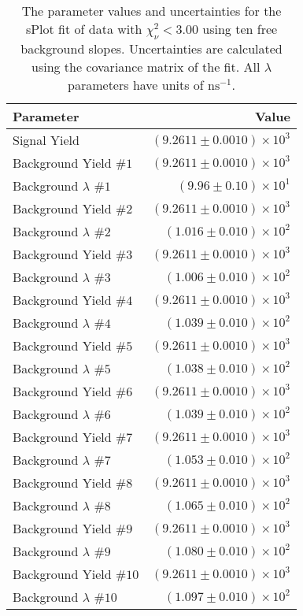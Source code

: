 
\begin{table}[ht]
    \begin{center}
        \begin{tabular}{lr}\toprule
            Parameter & Value \\\midrule
            Signal Yield & $(9.2611 \pm 0.0010) \times 10^{3}$ \\
            Background Yield $\#1$ & $(9.2611 \pm 0.0010) \times 10^{3}$ \\
            Background $\lambda$ $\#1$ & $(9.96 \pm 0.10) \times 10^{1}$ \\
            Background Yield $\#2$ & $(9.2611 \pm 0.0010) \times 10^{3}$ \\
            Background $\lambda$ $\#2$ & $(1.016 \pm 0.010) \times 10^{2}$ \\
            Background Yield $\#3$ & $(9.2611 \pm 0.0010) \times 10^{3}$ \\
            Background $\lambda$ $\#3$ & $(1.006 \pm 0.010) \times 10^{2}$ \\
            Background Yield $\#4$ & $(9.2611 \pm 0.0010) \times 10^{3}$ \\
            Background $\lambda$ $\#4$ & $(1.039 \pm 0.010) \times 10^{2}$ \\
            Background Yield $\#5$ & $(9.2611 \pm 0.0010) \times 10^{3}$ \\
            Background $\lambda$ $\#5$ & $(1.038 \pm 0.010) \times 10^{2}$ \\
            Background Yield $\#6$ & $(9.2611 \pm 0.0010) \times 10^{3}$ \\
            Background $\lambda$ $\#6$ & $(1.039 \pm 0.010) \times 10^{2}$ \\
            Background Yield $\#7$ & $(9.2611 \pm 0.0010) \times 10^{3}$ \\
            Background $\lambda$ $\#7$ & $(1.053 \pm 0.010) \times 10^{2}$ \\
            Background Yield $\#8$ & $(9.2611 \pm 0.0010) \times 10^{3}$ \\
            Background $\lambda$ $\#8$ & $(1.065 \pm 0.010) \times 10^{2}$ \\
            Background Yield $\#9$ & $(9.2611 \pm 0.0010) \times 10^{3}$ \\
            Background $\lambda$ $\#9$ & $(1.080 \pm 0.010) \times 10^{2}$ \\
            Background Yield $\#10$ & $(9.2611 \pm 0.0010) \times 10^{3}$ \\
            Background $\lambda$ $\#10$ & $(1.097 \pm 0.010) \times 10^{2}$ \\\bottomrule
        \end{tabular}
        \caption{The parameter values and uncertainties for the sPlot fit of data with $\chi^2_\nu < 3.00$ using ten free background slopes. Uncertainties are calculated using the covariance matrix of the fit. All $\lambda$ parameters have units of $\si{\nano\second}^{-1}$.}\label{tab:splot-fit-results-chisqdof-3.00-free-10}
    \end{center}
\end{table}
